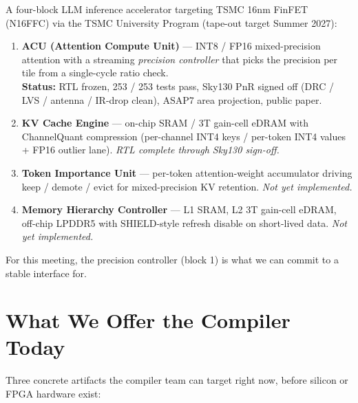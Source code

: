 \documentclass[11pt]{article}
\begin{document}
A four-block LLM inference accelerator targeting TSMC 16nm FinFET (N16FFC) via the TSMC
University Program (tape-out target Summer 2027):
\begin{enumerate}
\item \textbf{ACU (Attention Compute Unit)} --- INT8 / FP16 mixed-precision
  attention with a streaming \emph{precision controller} that picks the
  precision per tile from a single-cycle ratio check.\\
  \textbf{Status:} RTL frozen, 253 / 253 tests pass, Sky130 PnR signed off
  (DRC / LVS / antenna / IR-drop clean), ASAP7 area projection, public paper.
\item \textbf{KV Cache Engine} --- on-chip SRAM / 3T gain-cell eDRAM with
  ChannelQuant compression (per-channel INT4 keys / per-token INT4 values +
  FP16 outlier lane). \emph{RTL complete through Sky130 sign-off.}
\item \textbf{Token Importance Unit} --- per-token attention-weight
  accumulator driving keep / demote / evict for mixed-precision KV
  retention. \emph{Not yet implemented.}
\item \textbf{Memory Hierarchy Controller} --- L1 SRAM, L2 3T gain-cell eDRAM, off-chip
  LPDDR5 with SHIELD-style refresh disable on short-lived data.
  \emph{Not yet implemented.}
\end{enumerate}
For this meeting, the precision controller (block 1) is what we can commit
to a stable interface for.

\section{What We Offer the Compiler Today}
\label{sec:offer}

Three concrete artifacts the compiler team can target right now, before
silicon or FPGA hardware exist:
\end{document}
